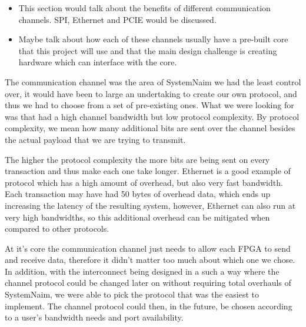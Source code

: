 \begin{itemize}
    \item This section would talk about the benefits of different communication channels. SPI, Ethernet and PCIE would be discussed.
    \item Maybe talk about how each of these channels usually have a pre-built core that this project will use and that the main design challenge is creating hardware which can interface with the core.
\end{itemize}

The communication channel was the area of SystemNaim we had the least control over, it would have been to large an undertaking to create our own protocol, and thus we had to choose from a set of pre-existing ones. What we were looking for was that had a high channel bandwidth but low protocol complexity. By protocol complexity, we mean how many additional bits are sent over the channel besides the actual payload that we are trying to transmit.

The higher the protocol complexity the more bits are being sent on every transaction and thus make each one take longer. Ethernet is a good example of protocol which has a high amount of overhead, but also very fast bandwidth. Each transaction may have had 50 bytes of overhead data, which ends up increasing the latency of the resulting system, however, Ethernet can also run at very high bandwidths, so this additional overhead can be mitigated when compared to other protocols.

At it's core the communication channel just needs to allow each FPGA to send and receive data, therefore it didn't matter too much about which one we chose. In addition, with the interconnect being designed in a such a way where the channel protocol could be changed later on without requiring total overhauls of SystemNaim, we were able to pick the protocol that was the easiest to implement. The channel protocol could then, in the future, be chosen according to a user's bandwidth needs and port availability.

